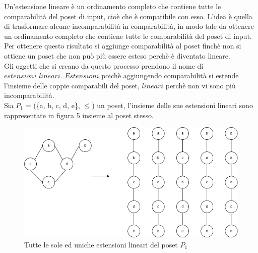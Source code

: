 \documentclass[12pt]{article}
\begin{document}
Un'estensione lineare è un ordinamento completo che contiene tutte le comparabilità del poset di input, cioè che è compatibile con esso. 
L'idea è quella di trasformare alcune incomparabilità in comparabilità, in modo tale da ottenere un ordinamento completo che contiene tutte 
le comparabilità del poset di input. Per ottenere questo risultato si aggiunge comparabilità al poset finchè non si ottiene un poset che non
può più essere esteso perchè è diventato lineare. \\
Gli oggetti che si creano da questo processo prendono il nome di $\textit{estensioni lineari}$. $\textit{Estensioni}$ poichè aggiungendo comparabilità
si estende l'insieme delle coppie comparabili del poset, $\textit{lineari}$ perchè non vi sono più incomparabilità. \\
Sia $P_1$ = (\{a, b, c, d, e\}, $\leq$) un poset, l'insieme delle sue estensioni lineari sono rappresentate in figura 5 insieme 
al poset stesso. 
\begin{figure}[H]
    \centering
    \includegraphics[scale=.5]{estensione_lin.png}
    \caption{Tutte le sole ed uniche estensioni lineari del poset $P_1$}
\end{figure}
\end{document}
